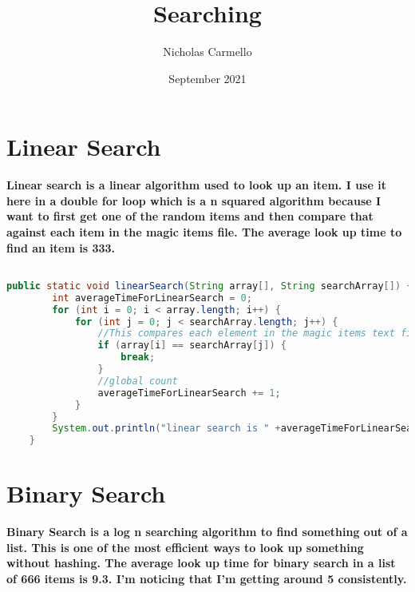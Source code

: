 \documentclass{article}
\begin{document}
\title{Searching}
\author{Nicholas Carmello}
\date{September 2021}
\section{Linear Search}
\textbf{Linear search is a linear algorithm used to look up an item. I use it here in a double for loop which is a n squared algorithm because I want to first get one of the random items and then compare that against each item in the magic items file. The average look up time to find an item is 333.}
\begin{lstlisting}[language = java]

public static void linearSearch(String array[], String searchArray[]) {
        int averageTimeForLinearSearch = 0;
        for (int i = 0; i < array.length; i++) {
            for (int j = 0; j < searchArray.length; j++) {
                //This compares each element in the magic items text file to the current random item
                if (array[i] == searchArray[j]) {
                    break;
                }
                //global count
                averageTimeForLinearSearch += 1;
            }
        }
        System.out.println("linear search is " +averageTimeForLinearSearch / 42);
    }
\end{lstlisting}
\section{Binary Search}

\textbf{Binary Search is a log n searching algorithm to find something out of a list. This is one of the most efficient ways to look up something without hashing. The average look up time for binary search in a list of 666 items is 9.3. I'm noticing that I'm getting around 5 consistently.}
\end{document}
